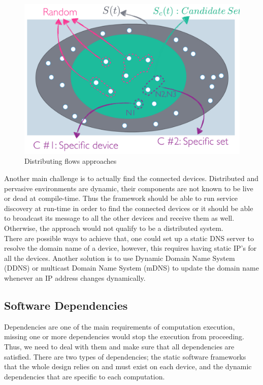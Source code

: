  \begin{figure}[H]
 	\centering
 	\includegraphics[scale=0.45]{images/set.png} 
 	\caption{Distributing flows approaches}
 	\label{fig:distributing-flows}
 \end{figure}

\noindent Another main challenge is to actually find the connected devices. Distributed and pervasive environments are dynamic, their components are not known to be live or dead at compile-time. Thus the framework should be able to run service discovery at run-time in order to find the connected devices or it should be able to broadcast its message to all the other devices and receive them as well. Otherwise, the approach would not qualify to be a distributed system. \\

\noindent There are possible ways to achieve that, one could set up a static DNS server to resolve the domain name of a device, however, this requires having static IP's for all the devices. Another solution is to use Dynamic  Domain Name System (DDNS) \cite{bound1997dynamic} or  multicast Domain Name System (mDNS) \cite{cheshire2013multicast} to update the domain name whenever an IP address changes dynamically.









\subsection{Software Dependencies}

Dependencies are one of the main requirements of computation execution, missing one or more dependencies would stop the execution from proceeding. Thus, we need to deal with them and make sure that all dependencies are satisfied.  There are two types of dependencies; the static software frameworks that the whole design relies on and must exist on each device, and the dynamic dependencies that are specific to each computation. \\

